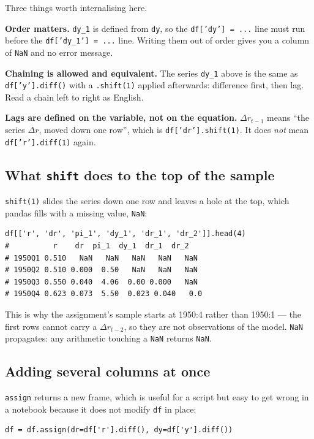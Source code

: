 \documentclass[11pt]{article}
\newcommand{\code}[1]{\texttt{#1}}
\begin{document}
\noindent Three things worth internalising here.

\textbf{Order matters.} \code{dy\_1} is defined from \code{dy}, so the
\code{df['dy'] = ...} line must run before the \code{df['dy\_1'] = ...} line.
Writing them out of order gives you a column of \code{NaN} and no error message.

\textbf{Chaining is allowed and equivalent.} The series \code{dy\_1} above is the
same as \code{df['y'].diff()} with a \code{.shift(1)} applied afterwards:
difference first, then lag. Read a chain left to right as English.

\textbf{Lags are defined on the variable, not on the equation.}
$\Delta r_{t-1}$ means ``the series $\Delta r$, moved down one row'', which is
\code{df['dr'].shift(1)}. It does \emph{not} mean \code{df['r'].diff(1)} again.

\subsection{What \code{shift} does to the top of the sample}

\code{shift(1)} slides the series down one row and leaves a hole at the top,
which pandas fills with a missing value, \code{NaN}:

\begin{lstlisting}
df[['r', 'dr', 'pi_1', 'dy_1', 'dr_1', 'dr_2']].head(4)
#          r    dr  pi_1  dy_1  dr_1  dr_2
# 1950Q1 0.510   NaN   NaN   NaN   NaN   NaN
# 1950Q2 0.510 0.000  0.50   NaN   NaN   NaN
# 1950Q3 0.550 0.040  4.06  0.00 0.000   NaN
# 1950Q4 0.623 0.073  5.50  0.023 0.040   0.0
\end{lstlisting}

\noindent This is why the assignment's sample starts at 1950:4 rather than
1950:1 --- the first rows cannot carry a $\Delta r_{t-2}$, so they are not
observations of the model. \code{NaN} propagates: any arithmetic touching a
\code{NaN} returns \code{NaN}.

\subsection{Adding several columns at once}

\code{assign} returns a new frame, which is useful for a script but easy to get
wrong in a notebook because it does not modify \code{df} in place:

\begin{lstlisting}
df = df.assign(dr=df['r'].diff(), dy=df['y'].diff())
\end{lstlisting}
\end{document}

